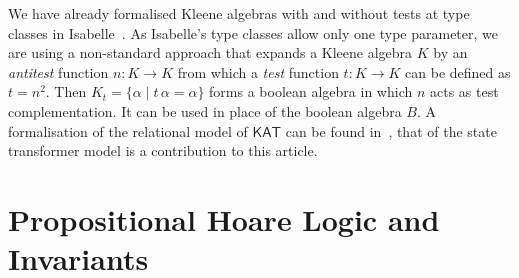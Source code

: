 \documentclass[envcountsames]{llncs}
\newcommand{\KAT}{\mathsf{KAT}}
\begin{document}
We have already formalised Kleene algebras with and without tests at
type classes in Isabelle~\cite{afp:ka,afp:kat}.  As Isabelle's type
classes allow only one type parameter, we are using a non-standard
approach that expands a Kleene algebra $K$ by an \emph{antitest}
function $n:K\to K$ from which a \emph{test} function $t:K\to K$ can
be defined as $t=n^2$. Then
$K_t = \{\alpha \mid t\, \alpha = \alpha\}$ forms a boolean algebra in
which $n$ acts as test complementation. It can be used in place of the
boolean algebra $B$.  A formalisation of the relational model of
$\KAT$ can be found in~\cite{afp:kat}, that of the state transformer
model is a contribution to this article.



\section{Propositional Hoare Logic and Invariants}\label{sec:hl-invariants}
\end{document}
